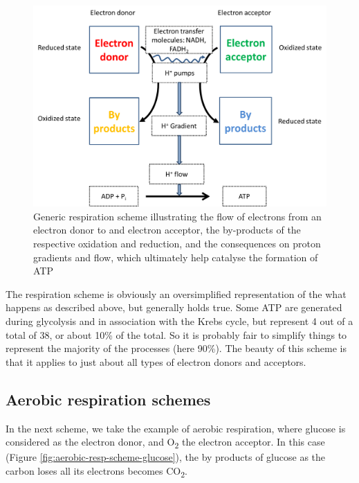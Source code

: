 \documentclass[]{book}
\theoremstyle{definition}
\theoremstyle{definition}
\theoremstyle{definition}
\theoremstyle{remark}
\begin{document}
\begin{figure}

{\centering \includegraphics[width=0.75\linewidth]{pictures/generic-respiration-scheme} 

}

\caption{Generic respiration scheme illustrating the flow of electrons from an electron donor to and electron acceptor, the by-products of the respective oxidation and reduction, and the consequences on proton gradients and flow, which ultimately help catalyse the formation of ATP}\label{fig:generic-resp-scheme}
\end{figure}

The respiration scheme is obviously an oversimplified representation of
the what happens as described above, but generally holds true. Some ATP
are generated during glycolysis and in association with the Krebs cycle,
but represent 4 out of a total of 38, or about 10\% of the total. So it
is probably fair to simplify things to represent the majority of the
processes (here 90\%). The beauty of this scheme is that it applies to
just about all types of electron donors and acceptors.

\subsection{Aerobic respiration
schemes}\label{aerobic-respiration-schemes}

In the next scheme, we take the example of aerobic respiration, where
glucose is considered as the electron donor, and O\textsubscript{2} the
electron acceptor. In this case (Figure
\ref{fig:aerobic-resp-scheme-glucose}), the by products of glucose as
the carbon loses all its electrons becomes CO\textsubscript{2}.
\end{document}
